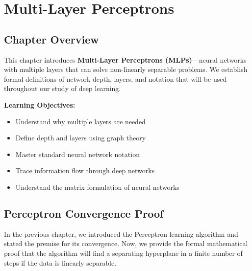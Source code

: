 
\chapter{Multi-Layer Perceptrons}
\label{ch:mlp}


\section{Chapter Overview}

This chapter introduces \textbf{Multi-Layer Perceptrons (MLPs)}---neural networks with multiple layers that can solve non-linearly separable problems. We establish formal definitions of network depth, layers, and notation that will be used throughout our study of deep learning.

\textbf{Learning Objectives:}
\begin{itemize}
    \item Understand why multiple layers are needed
    \item Define depth and layers using graph theory
    \item Master standard neural network notation
    \item Trace information flow through deep networks
    \item Understand the matrix formulation of neural networks
\end{itemize}


\section{Perceptron Convergence Proof}

In the previous chapter, we introduced the Perceptron learning algorithm and stated the premise for its convergence. Now, we provide the formal mathematical proof that the algorithm will find a separating hyperplane in a finite number of steps if the data is linearly separable.

